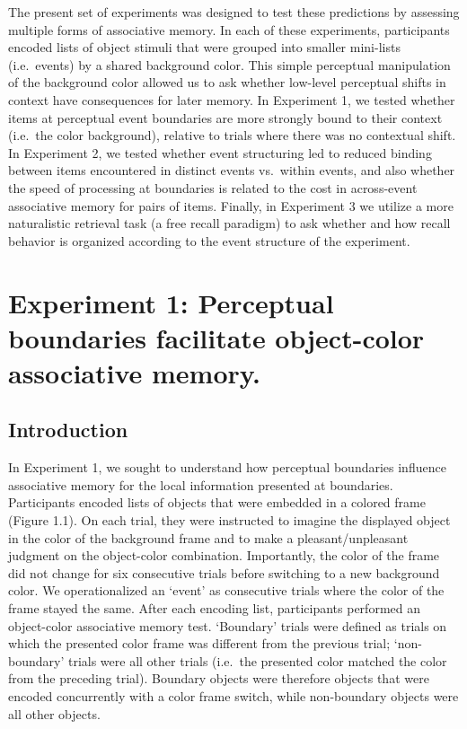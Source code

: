 The present set of experiments was designed to test these predictions by
assessing multiple forms of associative memory. In each of these
experiments, participants encoded lists of object stimuli that were
grouped into smaller mini-lists (i.e.~events) by a shared background
color. This simple perceptual manipulation of the background color
allowed us to ask whether low-level perceptual shifts in context have
consequences for later memory. In Experiment 1, we tested whether items
at perceptual event boundaries are more strongly bound to their context
(i.e.~the color background), relative to trials where there was no
contextual shift. In Experiment 2, we tested whether event structuring
led to reduced binding between items encountered in distinct events
vs.~within events, and also whether the speed of processing at
boundaries is related to the cost in across-event associative memory for
pairs of items. Finally, in Experiment 3 we utilize a more naturalistic
retrieval task (a free recall paradigm) to ask whether and how recall
behavior is organized according to the event structure of the
experiment.

\section{Experiment 1: Perceptual boundaries facilitate object-color
associative
memory.}\label{experiment-1-perceptual-boundaries-facilitate-object-color-associative-memory.}

\subsection{Introduction}\label{introduction}

In Experiment 1, we sought to understand how perceptual boundaries
influence associative memory for the local information presented at
boundaries. Participants encoded lists of objects that were embedded in
a colored frame (Figure 1.1). On each trial, they were instructed to
imagine the displayed object in the color of the background frame and to
make a pleasant/unpleasant judgment on the object-color combination.
Importantly, the color of the frame did not change for six consecutive
trials before switching to a new background color. We operationalized an
`event' as consecutive trials where the color of the frame stayed the
same. After each encoding list, participants performed an object-color
associative memory test. `Boundary' trials were defined as trials on
which the presented color frame was different from the previous trial;
`non-boundary' trials were all other trials (i.e.~the presented color
matched the color from the preceding trial). Boundary objects were
therefore objects that were encoded concurrently with a color frame
switch, while non-boundary objects were all other objects.

